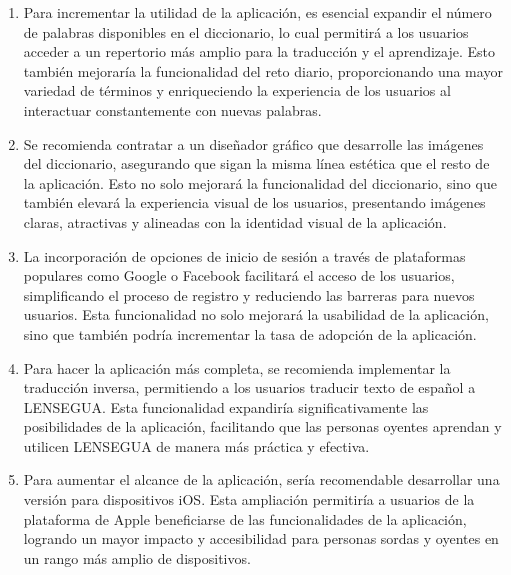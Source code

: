 \begin{enumerate}
    \item Para incrementar la utilidad de la aplicación, es esencial expandir el número de palabras disponibles en el diccionario, lo cual permitirá a los usuarios acceder a un repertorio más amplio para la traducción y el aprendizaje. Esto también mejoraría la funcionalidad del reto diario, proporcionando una mayor variedad de términos y enriqueciendo la experiencia de los usuarios al interactuar constantemente con nuevas palabras.

    \item Se recomienda contratar a un diseñador gráfico que desarrolle las imágenes del diccionario, asegurando que sigan la misma línea estética que el resto de la aplicación. Esto no solo mejorará la funcionalidad del diccionario, sino que también elevará la experiencia visual de los usuarios, presentando imágenes claras, atractivas y alineadas con la identidad visual de la aplicación.

    \item La incorporación de opciones de inicio de sesión a través de plataformas populares como Google o Facebook facilitará el acceso de los usuarios, simplificando el proceso de registro y reduciendo las barreras para nuevos usuarios. Esta funcionalidad no solo mejorará la usabilidad de la aplicación, sino que también podría incrementar la tasa de adopción de la aplicación.

    \item Para hacer la aplicación más completa, se recomienda implementar la traducción inversa, permitiendo a los usuarios traducir texto de español a LENSEGUA. Esta funcionalidad expandiría significativamente las posibilidades de la aplicación, facilitando que las personas oyentes aprendan y utilicen LENSEGUA de manera más práctica y efectiva.

    \item Para aumentar el alcance de la aplicación, sería recomendable desarrollar una versión para dispositivos iOS. Esta ampliación permitiría a usuarios de la plataforma de Apple beneficiarse de las funcionalidades de la aplicación, logrando un mayor impacto y accesibilidad para personas sordas y oyentes en un rango más amplio de dispositivos.




\end{enumerate}

